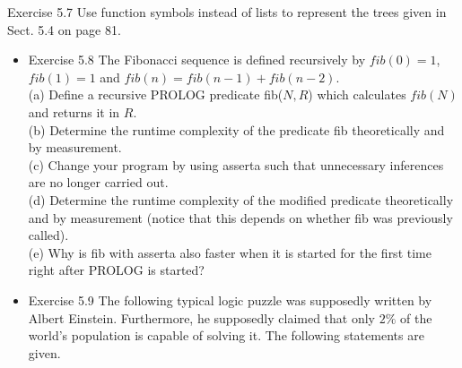\documentclass[10pt]{book}
\begin{document}
Exercise 5.7 Use function symbols instead of lists to represent the trees given in Sect. 5.4 on page 81.

\begin{itemize}
  \item Exercise 5.8 The Fibonacci sequence is defined recursively by $fib(0)=1$, $fib(1)=1$ and $fib(n)=fib(n-1)+fib(n-2)$.\\
(a) Define a recursive PROLOG predicate fib($N,R$) which calculates $fib(N)$ and returns it in $R$.\\
(b) Determine the runtime complexity of the predicate fib theoretically and by measurement.\\
(c) Change your program by using asserta such that unnecessary inferences are no longer carried out.\\
(d) Determine the runtime complexity of the modified predicate theoretically and by measurement (notice that this depends on whether fib was previously called).\\
(e) Why is fib with asserta also faster when it is started for the first time right after PROLOG is started?
  \item Exercise 5.9 The following typical logic puzzle was supposedly written by Albert Einstein. Furthermore, he supposedly claimed that only $2 \%$ of the world's population is capable of solving it. The following statements are given.
\end{itemize}
\end{document}
